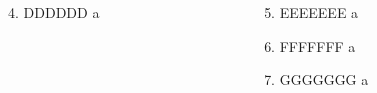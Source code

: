 \documentclass[14pt,dvipdfmx]{beamer}
\begin{document}
\begin{frame}[t]
\begin{columns}[t]
\begin{column}{.48\linewidth}
        \begin{block}{4. DDDDDD}
          a\vspace{10cm}
        \end{block}

      \end{column}
      \begin{column}{.48\linewidth}

        \begin{block}{5. EEEEEEE}
          a\vspace{10cm}
        \end{block}

        \begin{block}{6. FFFFFFF}
          a\vspace{10cm}
        \end{block}

        \begin{block}{7. GGGGGGG}
          a\vspace{10cm}
        \end{block}

      \end{column}
    \end{columns}
  \end{frame}
\end{document}
